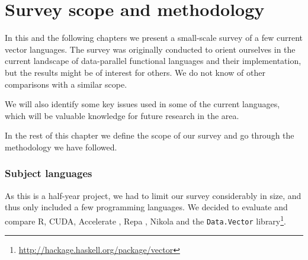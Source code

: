 \chapter{Survey scope and methodology}

%
%
%

In this and the following chapters we present a small-scale survey of
a few current vector languages. The survey was originally conducted to
orient ourselves in the current landscape of data-parallel functional
languages and their implementation, but the results might be of
interest for others. We do not know of other comparisons with a
similar scope.

We will also identify some key issues used in some of the current
languages, which will be valuable knowledge for future research in the
area.

In the rest of this chapter we define the scope of our survey and go
through the methodology we have followed.

\subsection{Subject languages}
%
%
%
%
%
%
As this is a half-year project, we had to limit our survey
considerably in size, and thus only included a few programming
languages. We decided to evaluate and compare R, CUDA, Accelerate
\cite{chakravarty2011accelerating}, Repa \cite{keller2010regular},
Nikola \cite{mainland2010nikola} and the \texttt{Data.Vector}
library\footnote{\url{http://hackage.haskell.org/package/vector}}. 

